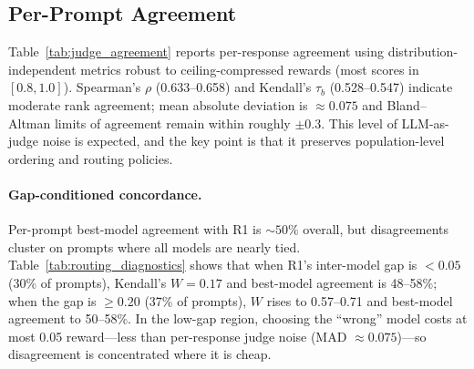 \subsection{Per-Prompt Agreement}

Table~\ref{tab:judge_agreement} reports per-response agreement using
distribution-independent metrics robust to ceiling-compressed rewards
(most scores in $[0.8, 1.0]$).  Spearman's $\rho$ (0.633--0.658) and
Kendall's $\tau_b$ (0.528--0.547) indicate moderate rank agreement;
mean absolute deviation is ${\approx}0.075$ and Bland--Altman limits
of agreement remain within roughly $\pm 0.3$.  This level of
LLM-as-judge noise is expected, and the key point is that it preserves
population-level ordering and routing policies.

\begin{table}[h]
\centering
\caption{Per-response agreement with DeepSeek-R1 ($6{,}000$ scored pairs
per judge).  All measures are rank-based or distribution-independent to avoid
attenuation from ceiling-compressed rewards.}
\label{tab:judge_agreement}
\small
{}
\end{table}

\paragraph{Gap-conditioned concordance.}
Per-prompt best-model agreement with R1 is ${\sim}50\%$ overall, but
disagreements cluster on prompts where all models are nearly tied.
Table~\ref{tab:routing_diagnostics} shows that when R1's inter-model
gap is $< 0.05$ (30\% of prompts), Kendall's $W = 0.17$ and
best-model agreement is 48--58\%; when the gap is $\geq 0.20$ (37\%
of prompts), $W$ rises to 0.57--0.71 and best-model agreement to
50--58\%.  In the low-gap region, choosing the ``wrong'' model costs
at most 0.05 reward---less than per-response judge noise
(MAD ${\approx} 0.075$)---so disagreement is concentrated where it is
cheap.

